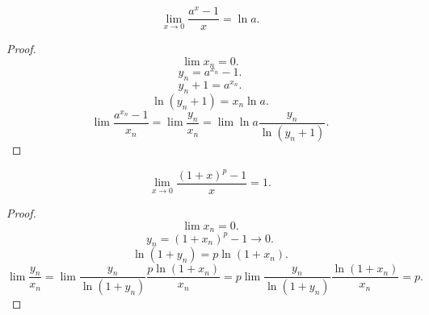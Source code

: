 \documentclass[11pt, oneside]{article}   	%
\begin{document}
    \begin{theorem}
        \[ \lim\limits_{x \to 0} \frac{a^x-1}{x} = \ln a .\]
        \begin{proof}
            \[ \lim x_n = 0.\]
            \[ y_n = a^{x_n} - 1 .\]
            \[ y_n + 1 = a^{x_n} .\]
            \[ \ln\left( y_n+1 \right) = x_n\ln a  .\]
            \[ \lim \frac{a^{x_n}-1}{x_n} = \lim \frac{y_n}{x_n} = \lim \ln a\frac{y_n}{\ln (y_n+1)} .\] 
        \end{proof}
    \end{theorem}
    \begin{theorem}
        \[ \lim\limits_{x \to 0} \frac{(1+x)^{p}-1}{x} = 1 .\]
        \begin{proof}
            \[ \lim x_n = 0 .\]
            \[ y_n = \left( 1+x_n \right)^{p} - 1 \to 0.\]
            \[ \ln(1+y_n) = p\ln(1+x_n) .\]
            \[ \lim \frac{y_n}{x_n} = \lim \frac{y_n}{\ln\left( 1+y_n \right) }\frac{p\ln\left( 1+x_n \right) }{x_n} = p\lim \frac{y_n}{\ln(1+y_n)}\frac{\ln(1+x_n)}{x_n} =p .\] 
        \end{proof}
    \end{theorem}
\end{document}
